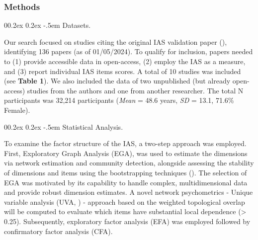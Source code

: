 \documentclass[
  man,
  floatsintext,
  longtable,
  nolmodern,
  notxfonts,
  notimes,
  colorlinks=true,linkcolor=blue,citecolor=blue,urlcolor=blue]{apa7}
\makeatletter
\renewcommand{\paragraph}{\@startsection{paragraph}{4}{\parindent}%
	{0\baselineskip \@plus 0.2ex \@minus 0.2ex}%
	{-.5em}%
	{\normalfont\normalsize\bfseries\typesectitle}}
\makeatother
\begin{document}
\subsubsection{Methods}\label{methods}

\paragraph{Datasets.}\label{datasets}

Our search focused on studies citing the original IAS validation paper
(), identifying 136 papers
(as of 01/05/2024). To qualify for inclusion, papers needed to (1)
provide accessible data in open-access, (2) employ the IAS as a measure,
and (3) report individual IAS items scores. A total of 10 studies was
included (see \textbf{Table 1}). We also included the data of two
unpublished (but already open-access) studies from the authors and one
from another researcher. The total N participants was 32,214
participants (\emph{Mean} = 48.6 years, \emph{SD} = 13.1, 71.6\%
Female).

\begin{landscape}



\end{landscape}

\paragraph{Statistical Analysis.}\label{statistical-analysis}

To examine the factor structure of the IAS, a two-step approach was
employed. First, Exploratory Graph Analysis (EGA), was used to estimate
the dimensions via network estimation and community detection, alongside
assessing the stability of dimensions and items using the bootstrapping
techniques (). The selection of EGA was motivated by its capability to handle
complex, multidimensional data and provide robust dimension estimates. A
novel network psychometrics - Unique variable analysis (UVA,
) -
approach based on the weighted topological overlap will be computed to
evaluate which items have substantial local dependence (\textgreater{}
0.25). Subsequently, exploratory factor analysis (EFA) was employed
followed by confirmatory factor analysis (CFA).
\end{document}

